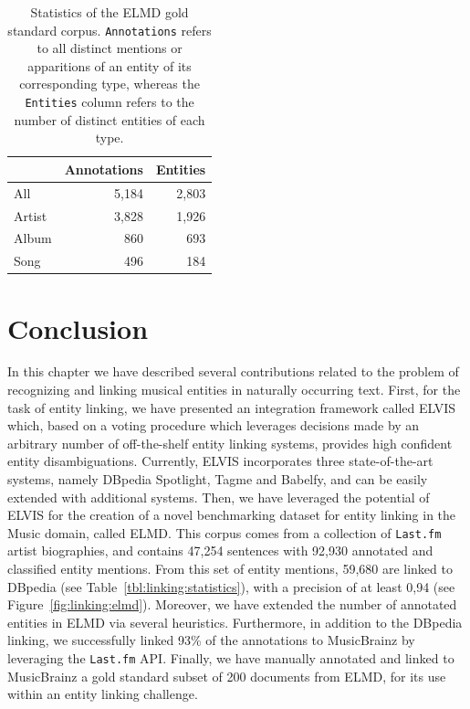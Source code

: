 \begin{table}[]
\centering
\begin{tabular}{l r r }
\hline
& \textbf{Annotations} & \textbf{Entities} \\ \hline
All    & 5,184      & 2,803    \\ 
Artist & 3,828      & 1,926    \\ 
Album  & 860       & 693    \\ 
Song  & 496        & 184     \\ \hline
\end{tabular}
\caption[Statistics of the ELMD gold standard corpus.]{Statistics of the ELMD gold standard corpus. \texttt{Annotations} refers to all distinct mentions or apparitions of an entity of its corresponding type, whereas the \texttt{Entities} column refers to the number of distinct entities of each type.}
\label{tbl:linking:ELMDGold}
\end{table}


\section{Conclusion}
\label{sec:linking:conclusions}

In this chapter we have described several contributions related to the problem of recognizing and linking musical entities in naturally occurring text. First, for the task of entity linking, we have presented an integration framework called \textsc{ELVIS} which, based on a voting procedure which leverages decisions made by an arbitrary number of off-the-shelf entity linking systems, provides high confident entity disambiguations. Currently, \textsc{ELVIS} incorporates three state-of-the-art systems, namely DBpedia Spotlight, Tagme and Babelfy, and can be easily extended with additional systems. %
Then, we have leveraged the potential of \textsc{ELVIS} for the creation of a novel benchmarking dataset for entity linking in the Music domain, called \textsc{ELMD}. This corpus comes from a collection of \texttt{Last.fm} artist biographies, and contains 47,254 sentences with 92,930 annotated and classified entity mentions. %
From this set of entity mentions, 59,680 are linked to DBpedia (see Table~\ref{tbl:linking:statistics}), with a precision of at least 0,94 (see Figure~\ref{fig:linking:elmd}).
Moreover, we have extended the number of annotated entities in ELMD via several heuristics. Furthermore, in addition to the DBpedia linking, we successfully linked 93\% of the annotations to MusicBrainz by leveraging the \texttt{Last.fm} API.
Finally, we have manually annotated and linked to MusicBrainz a gold standard subset of 200 documents from ELMD, for its use within an entity linking challenge.
